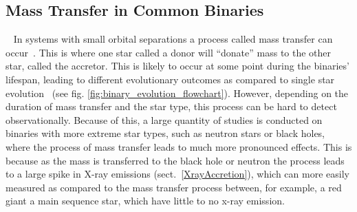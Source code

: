 \documentclass[12pt, a4paper]{article}
\begin{document}
    \subsection{Mass Transfer in Common Binaries}~\label{MassTransferinCommon}
    In systems with small orbital separations a process called mass transfer can occur~\parencite{TaurisvandenHeuvel+2023}. This is where one star called a donor will ``donate'' mass to the other star, called the accretor. This is likely to occur at some point during the binaries' lifespan, leading to different evolutionary outcomes as compared to single star evolution~\parencite{TaurisvandenHeuvel+2023} (see fig. \ref{fig:binary_evolution_flowchart}). However, depending on the duration of mass transfer and the star type, this process can be hard to detect observationally. Because of this, a large quantity of studies is conducted on binaries with more extreme star types, such as neutron stars or black holes, where the process of mass transfer leads to much more pronounced effects. This is because as the mass is transferred to the black hole or neutron the process leads to a large spike in X-ray emissions (sect.~\ref{XrayAccretion}), which can more easily measured as compared to the mass transfer process between, for example, a red giant a main sequence star, which have little to no x-ray emission. 
\end{document}
